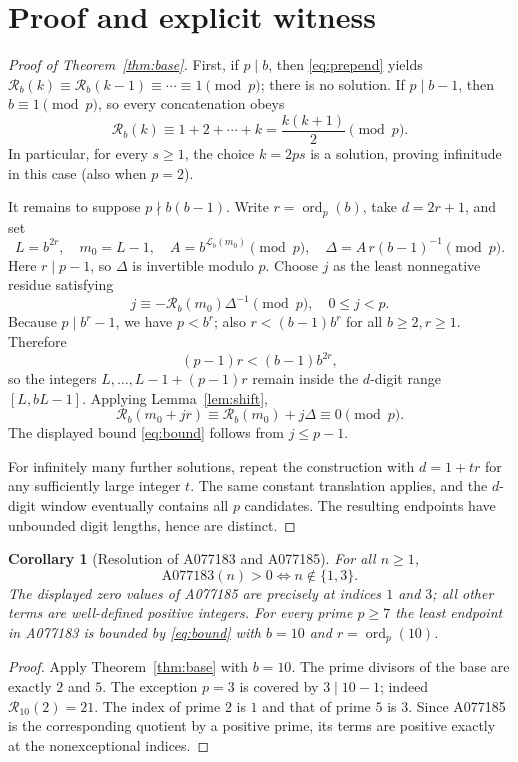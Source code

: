 \documentclass[9pt]{extarticle}
\newtheorem{corollary}{Corollary}
\newcommand{\ord}{\operatorname{ord}}
\newcommand{\len}{\mathcal{L}}
\newcommand{\rev}{\mathcal{R}}
\begin{document}
\section{Proof and explicit witness}
\begin{proof}[Proof of Theorem~\ref{thm:base}]
First, if $p\mid b$, then \eqref{eq:prepend} yields
$\rev_b(k)\equiv\rev_b(k-1)\equiv\cdots\equiv1\pmod p$;
there is no solution. If $p\mid b-1$, then $b\equiv1\pmod p$,
so every concatenation obeys
\[
\rev_b(k)\equiv1+2+\cdots+k=\frac{k(k+1)}2\pmod p.
\]
In particular, for every $s\ge1$, the choice $k=2ps$ is a
solution, proving infinitude in this case (also when $p=2$).

It remains to suppose $p\nmid b(b-1)$.
Write $r=\ord_p(b)$, take $d=2r+1$, and set
\[
L=b^{2r},\quad m_0=L-1,\quad
A=b^{\len_b(m_0)}\pmod p,\quad
\Delta=A\,r(b-1)^{-1}\pmod p.
\]
Here $r\mid p-1$, so $\Delta$ is invertible modulo $p$.
Choose $j$ as the least nonnegative residue satisfying
\begin{equation}\label{eq:j}
\boxed{\quad j\equiv-\rev_b(m_0)\Delta^{-1}\pmod p,\quad
0\le j<p.\quad}
\end{equation}
Because $p\mid b^r-1$, we have $p<b^r$; also
$r<(b-1)b^r$ for all $b\ge2,r\ge1$. Therefore
\[
(p-1)r<(b-1)b^{2r},
\]
so the integers $L,\ldots,L-1+(p-1)r$ remain inside the
$d$-digit range $[L,bL-1]$. Applying Lemma~\ref{lem:shift},
\[
\rev_b(m_0+jr)\equiv\rev_b(m_0)+j\Delta\equiv0\pmod p.
\]
The displayed bound \eqref{eq:bound} follows from $j\le p-1$.

For infinitely many further solutions, repeat the construction with
$d=1+tr$ for any sufficiently large integer $t$. The same
constant translation applies, and the $d$-digit window eventually
contains all $p$ candidates. The resulting endpoints have
unbounded digit lengths, hence are distinct.
\end{proof}

\begin{corollary}[Resolution of A077183 and A077185]\label{cor:oeis}
For all $n\ge1$,
\[
\boxed{\mathrm{A077183}(n)>0\iff n\notin\{1,3\}.}
\]
The displayed zero values of A077185 are precisely at indices
$1$ and $3$; all other terms are well-defined positive integers.
For every prime $p\ge7$ the least endpoint in A077183 is bounded
by \eqref{eq:bound} with $b=10$ and $r=\ord_p(10)$.
\end{corollary}
\begin{proof}
Apply Theorem~\ref{thm:base} with $b=10$. The prime divisors
of the base are exactly $2$ and $5$. The exception $p=3$ is
covered by $3\mid10-1$; indeed $\rev_{10}(2)=21$.
The index of prime $2$ is $1$ and that of prime $5$ is $3$.
Since A077185 is the corresponding quotient by a positive prime,
its terms are positive exactly at the nonexceptional indices.
\end{proof}
\end{document}
